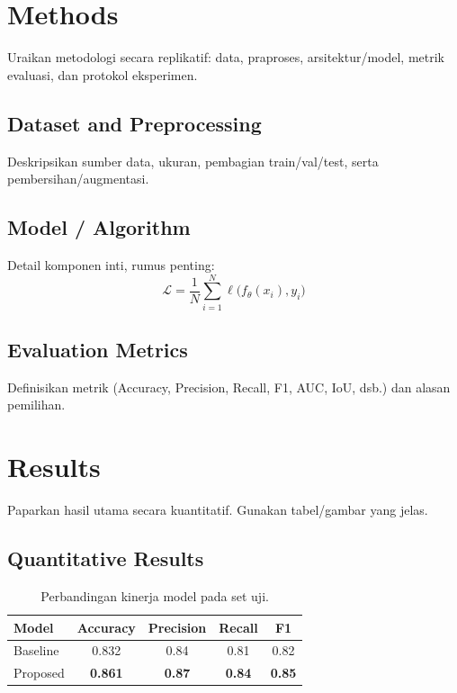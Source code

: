 \documentclass[10pt,a4paper]{article}
\begin{document}
	
	
	\section{Methods}
	Uraikan metodologi secara replikatif: data, praproses, arsitektur/model, metrik evaluasi, dan protokol eksperimen.
	\subsection{Dataset and Preprocessing}
	Deskripsikan sumber data, ukuran, pembagian train/val/test, serta pembersihan/augmentasi.
	\subsection{Model / Algorithm}
	Detail komponen inti, rumus penting:
	\begin{equation}
		\mathcal{L} = \frac{1}{N}\sum_{i=1}^{N} \ell\big(f_\theta(x_i), y_i\big)
	\end{equation}
	\subsection{Evaluation Metrics}
	Definisikan metrik (Accuracy, Precision, Recall, F1, AUC, IoU, dsb.) dan alasan pemilihan.
	
	\section{Results}
	Paparkan hasil utama secara kuantitatif. Gunakan tabel/gambar yang jelas.
	\subsection{Quantitative Results}
	\begin{table}[h]
		\centering
		\caption{Perbandingan kinerja model pada set uji.}
		\label{tab:results}
		\begin{tabular}{lcccc}
			\toprule
			Model & Accuracy & Precision & Recall & F1 \\
			\midrule
			Baseline & 0.832 & 0.84 & 0.81 & 0.82 \\
			Proposed & \textbf{0.861} & \textbf{0.87} & \textbf{0.84} & \textbf{0.85} \\
			\bottomrule
		\end{tabular}
	\end{table}
	
\end{document}
